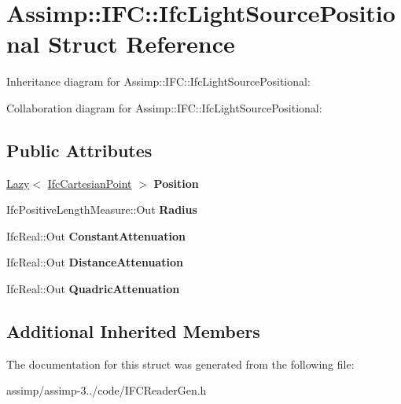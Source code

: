\hypertarget{struct_assimp_1_1_i_f_c_1_1_ifc_light_source_positional}{\section{Assimp\+:\+:I\+F\+C\+:\+:Ifc\+Light\+Source\+Positional Struct Reference}
\label{struct_assimp_1_1_i_f_c_1_1_ifc_light_source_positional}
}


Inheritance diagram for Assimp\+:\+:I\+F\+C\+:\+:Ifc\+Light\+Source\+Positional\+:


Collaboration diagram for Assimp\+:\+:I\+F\+C\+:\+:Ifc\+Light\+Source\+Positional\+:
\subsection*{Public Attributes}
\begin{DoxyCompactItemize}
\item 
\hypertarget{struct_assimp_1_1_i_f_c_1_1_ifc_light_source_positional_a1026a5d8c4c241b678825947f5f2d711}{\hyperlink{struct_assimp_1_1_s_t_e_p_1_1_lazy}{Lazy}$<$ \hyperlink{struct_assimp_1_1_i_f_c_1_1_ifc_cartesian_point}{Ifc\+Cartesian\+Point} $>$ {\bfseries Position}}\label{struct_assimp_1_1_i_f_c_1_1_ifc_light_source_positional_a1026a5d8c4c241b678825947f5f2d711}

\item 
\hypertarget{struct_assimp_1_1_i_f_c_1_1_ifc_light_source_positional_aa05a478da20d9fed3d638c37ef91d06b}{Ifc\+Positive\+Length\+Measure\+::\+Out {\bfseries Radius}}\label{struct_assimp_1_1_i_f_c_1_1_ifc_light_source_positional_aa05a478da20d9fed3d638c37ef91d06b}

\item 
\hypertarget{struct_assimp_1_1_i_f_c_1_1_ifc_light_source_positional_aa0efb4b50f6dd028c34afac59a22909c}{Ifc\+Real\+::\+Out {\bfseries Constant\+Attenuation}}\label{struct_assimp_1_1_i_f_c_1_1_ifc_light_source_positional_aa0efb4b50f6dd028c34afac59a22909c}

\item 
\hypertarget{struct_assimp_1_1_i_f_c_1_1_ifc_light_source_positional_a27bb73239735db2bb96456158c25cedd}{Ifc\+Real\+::\+Out {\bfseries Distance\+Attenuation}}\label{struct_assimp_1_1_i_f_c_1_1_ifc_light_source_positional_a27bb73239735db2bb96456158c25cedd}

\item 
\hypertarget{struct_assimp_1_1_i_f_c_1_1_ifc_light_source_positional_a1e9d645363ac41024d2da9362f6cc1d1}{Ifc\+Real\+::\+Out {\bfseries Quadric\+Attenuation}}\label{struct_assimp_1_1_i_f_c_1_1_ifc_light_source_positional_a1e9d645363ac41024d2da9362f6cc1d1}

\end{DoxyCompactItemize}
\subsection*{Additional Inherited Members}


The documentation for this struct was generated from the following file\+:\begin{DoxyCompactItemize}
\item 
assimp/assimp-\/3../code/I\+F\+C\+Reader\+Gen.\+h\end{DoxyCompactItemize}
